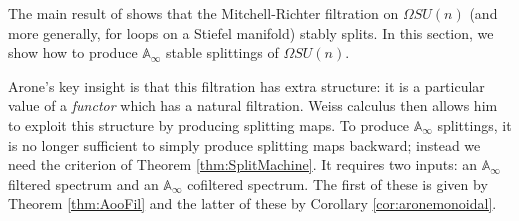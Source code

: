 The main result of \cite{Arone} shows that the Mitchell-Richter filtration on $\Omega SU(n)$ (and more generally, for loops on a Stiefel manifold) stably splits.  In this section, we show how to produce $\mathbb{A}_\infty$ stable splittings of $\Omega SU(n)$.  %


Arone's key insight is that this filtration has extra structure: it is a particular value of a \emph{functor} which has a natural filtration.  Weiss calculus then allows him to exploit this structure by producing splitting maps.  To produce $\mathbb{A}_\infty$ splittings, it is no longer sufficient to simply produce splitting maps backward; instead we need the criterion of Theorem \ref{thm:SplitMachine}.  It requires two inputs: an $\mathbb{A}_{\infty}$ filtered spectrum and an $\mathbb{A}_{\infty}$ cofiltered spectrum.  The first of these is given by Theorem \ref{thm:AooFil} and the latter of these by Corollary \ref{cor:aronemonoidal}.  %
